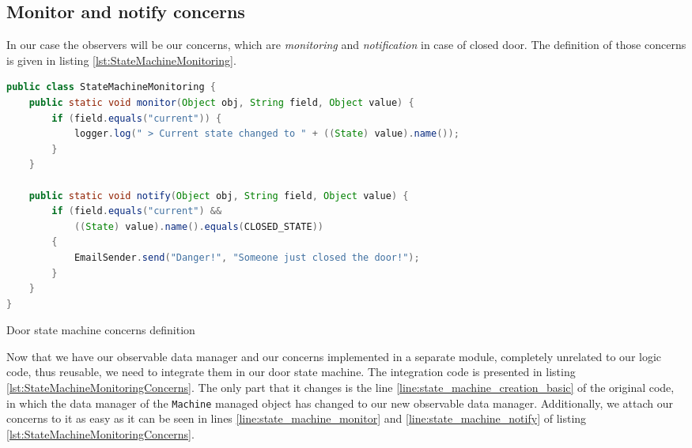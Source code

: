 \subsection{Monitor and notify concerns}
In our case the observers will be our concerns, which are \textit{monitoring} and \textit{notification} in case of closed door. 
The definition of those concerns is given in listing \ref{lst:StateMachineMonitoring}.

\begin{sourcecode} [H]
	\begin{lstlisting}[language=Java, escapechar=|]
public class StateMachineMonitoring {
    public static void monitor(Object obj, String field, Object value) {
        if (field.equals("current")) {
            logger.log(" > Current state changed to " + ((State) value).name());
        }
    }

    public static void notify(Object obj, String field, Object value) {
        if (field.equals("current") && 
            ((State) value).name().equals(CLOSED_STATE)) 
        {
            EmailSender.send("Danger!", "Someone just closed the door!");
        }
    }
}
	\end{lstlisting}
	\caption{Door state machine concerns definition}
	\label{lst:StateMachineMonitoring}
\end{sourcecode}

Now that we have our observable data manager and our concerns implemented in a separate module, completely unrelated to our logic code, thus reusable, we need to integrate them in our door state machine.
The integration code is presented in listing \ref{lst:StateMachineMonitoringConcerns}.
The only part that it changes is the line \ref{line:state_machine_creation_basic} of the original code, in which the data manager of the \texttt{Machine} managed object has changed to our new observable data manager.
Additionally, we attach our concerns to it as easy as it can be seen in lines \ref{line:state_machine_monitor} and \ref{line:state_machine_notify} of listing \ref{lst:StateMachineMonitoringConcerns}.


